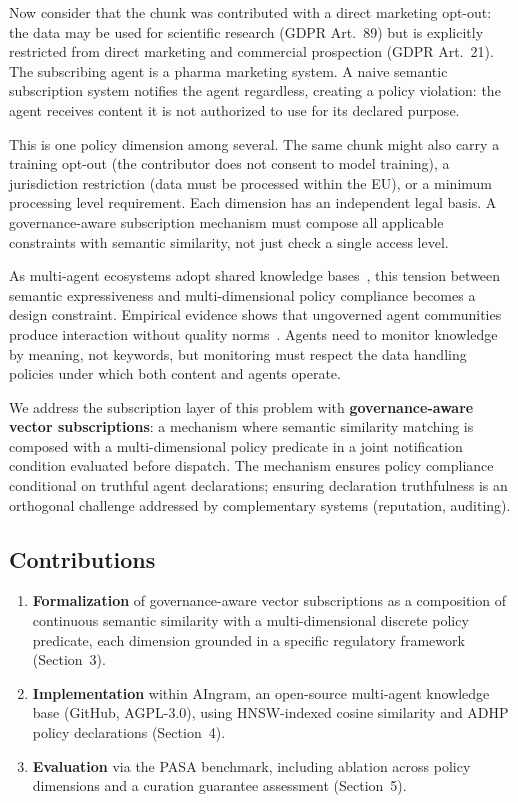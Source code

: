 \documentclass[11pt]{article}
\begin{document}
Now consider that the chunk was contributed with a direct marketing opt-out: the data may be used for scientific research (GDPR Art.~89) but is explicitly restricted from direct marketing and commercial prospection (GDPR Art.~21). The subscribing agent is a pharma marketing system. A naive semantic subscription system notifies the agent regardless, creating a policy violation: the agent receives content it is not authorized to use for its declared purpose.

This is one policy dimension among several. The same chunk might also carry a training opt-out (the contributor does not consent to model training), a jurisdiction restriction (data must be processed within the EU), or a minimum processing level requirement. Each dimension has an independent legal basis. A governance-aware subscription mechanism must compose all applicable constraints with semantic similarity, not just check a single access level.

As multi-agent ecosystems adopt shared knowledge bases~\cite{rezazadeh2025,li2025maas,masoor2025}, this tension between semantic expressiveness and multi-dimensional policy compliance becomes a design constraint. Empirical evidence shows that ungoverned agent communities produce interaction without quality norms~\cite{li2026moltbook}. Agents need to monitor knowledge by meaning, not keywords, but monitoring must respect the data handling policies under which both content and agents operate.

We address the subscription layer of this problem with \textbf{governance-aware vector subscriptions}: a mechanism where semantic similarity matching is composed with a multi-dimensional policy predicate in a joint notification condition evaluated before dispatch. The mechanism ensures policy compliance conditional on truthful agent declarations; ensuring declaration truthfulness is an orthogonal challenge addressed by complementary systems (reputation, auditing).

\subsection{Contributions}

\begin{enumerate}[leftmargin=*]
\item \textbf{Formalization} of governance-aware vector subscriptions as a composition of continuous semantic similarity with a multi-dimensional discrete policy predicate, each dimension grounded in a specific regulatory framework (Section~3).

\item \textbf{Implementation} within AIngram, an open-source multi-agent knowledge base (GitHub, AGPL-3.0), using HNSW-indexed cosine similarity and ADHP policy declarations (Section~4).

\item \textbf{Evaluation} via the PASA benchmark, including ablation across policy dimensions and a curation guarantee assessment (Section~5).
\end{enumerate}
\end{document}
